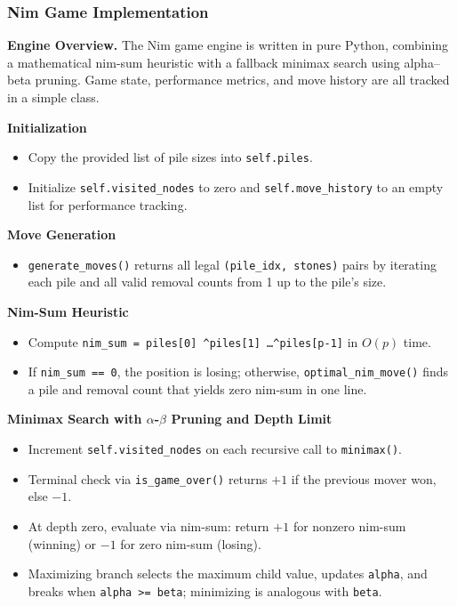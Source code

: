 \documentclass[12pt]{article}
\begin{document}
\subsubsection{Nim Game Implementation}

\noindent\textbf{Engine Overview.}  
The Nim game engine is written in pure Python, combining a mathematical nim-sum heuristic with a fallback minimax search using alpha–beta pruning. Game state, performance metrics, and move history are all tracked in a simple class.

\vspace{1em}

\noindent\textbf{Initialization}
\begin{itemize}
  \item Copy the provided list of pile sizes into \texttt{self.piles}.  
  \item Initialize \texttt{self.visited\_nodes} to zero and \texttt{self.move\_history} to an empty list for performance tracking.
\end{itemize}

\noindent\textbf{Move Generation}
\begin{itemize}
  \item \texttt{generate\_moves()} returns all legal \texttt{(pile\_idx, stones)} pairs by iterating each pile and all valid removal counts from 1 up to the pile’s size.
\end{itemize}

\noindent\textbf{Nim-Sum Heuristic}
\begin{itemize}
  \item Compute \texttt{nim\_sum = piles[0] \textasciicircum piles[1] \dots \textasciicircum piles[p-1]} in $O(p)$ time.
  \item If \texttt{nim\_sum == 0}, the position is losing; otherwise, \texttt{optimal\_nim\_move()} finds a pile and removal count that yields zero nim-sum in one line.
\end{itemize}

\noindent\textbf{Minimax Search with \(\alpha\)-\(\beta\) Pruning and Depth Limit}
\begin{itemize}
  \item Increment \texttt{self.visited\_nodes} on each recursive call to \texttt{minimax()}.
  \item Terminal check via \texttt{is\_game\_over()} returns $+1$ if the previous mover won, else $-1$.
  \item At depth zero, evaluate via nim-sum: return $+1$ for nonzero nim-sum (winning) or $-1$ for zero nim-sum (losing).
  \item Maximizing branch selects the maximum child value, updates \texttt{alpha}, and breaks when \texttt{alpha >= beta}; minimizing is analogous with \texttt{beta}.
\end{itemize}
\end{document}

